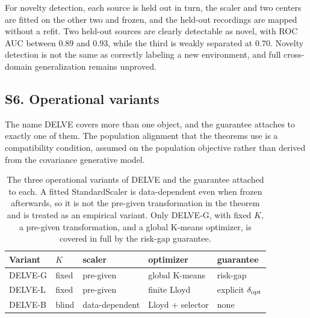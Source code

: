 For novelty detection, each source is held out in turn, the scaler and
two centers are fitted on the other two and frozen, and the held-out
recordings are mapped without a refit. Two held-out sources are clearly
detectable as novel, with ROC AUC between \(0.89\) and \(0.93\), while
the third is weakly separated at \(0.70\). Novelty detection is not the
same as correctly labeling a new environment, and full cross-domain
generalization remains unproved.

\subsection{S6. Operational variants}\label{s6.-operational-variants}

The name DELVE covers more than one object, and the guarantee attaches
to exactly one of them. The population alignment that the theorems use
is a compatibility condition, assumed on the population objective rather
than derived from the covariance generative model.

\begin{table}[H]
\centering
\small
\caption{The three operational variants of DELVE and the guarantee attached to each. A fitted StandardScaler is data-dependent even when frozen afterwards, so it is not the pre-given transformation in the theorem and is treated as an empirical variant. Only DELVE-G, with fixed $K$, a pre-given transformation, and a global K-means optimizer, is covered in full by the risk-gap guarantee.}
\label{tab:variants}
\begin{tabular}{lllll}
\hline
Variant & $K$ & scaler & optimizer & guarantee\\
\hline
DELVE-G & fixed & pre-given & global K-means & risk-gap\\
DELVE-L & fixed & pre-given & finite Lloyd & explicit $\delta_{\rm opt}$\\
DELVE-B & blind & data-dependent & Lloyd + selector & none\\
\hline
\end{tabular}

\end{table}

